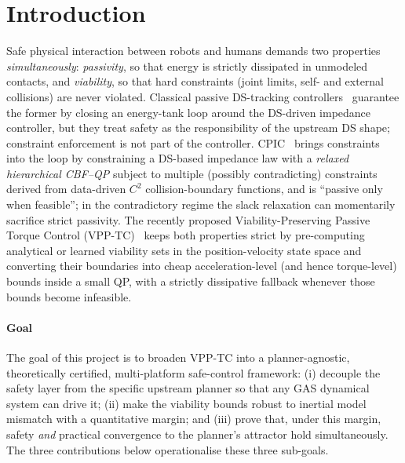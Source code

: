 \documentclass[10pt,conference]{IEEEtran}
\theoremstyle{remark}
\theoremstyle{plain}
\begin{document}
\section{Introduction}
\label{sec:intro}

Safe physical interaction between robots and humans demands two
properties \emph{simultaneously}: \emph{passivity}, so that energy
is strictly dissipated in unmodeled contacts, and \emph{viability},
so that hard constraints (joint limits, self- and external
collisions) are never violated.  Classical passive DS-tracking
controllers~\cite{kronander2016passive} guarantee the former by
closing an energy-tank loop around the DS-driven impedance
controller, but they treat safety as the responsibility of the
upstream DS shape; constraint enforcement is not part of the
controller. CPIC~\cite{zhang2024cpic} brings constraints into the
loop by constraining a DS-based impedance law with a
\emph{relaxed hierarchical CBF--QP} subject to multiple
(possibly contradicting) constraints derived from data-driven $C^2$
collision-boundary functions, and is ``passive only when feasible'';
in the contradictory regime the slack relaxation can momentarily
sacrifice strict passivity. The recently proposed
Viability-Preserving Passive Torque Control
(VPP-TC)~\cite{zhang2025vpptc} keeps both properties strict by
pre-computing analytical or learned viability sets in the
position-velocity state space and converting their boundaries into
cheap acceleration-level (and hence torque-level) bounds inside a
small QP, with a strictly dissipative fallback whenever those
bounds become infeasible.

\paragraph*{Goal} The goal of this project is to broaden VPP-TC
into a planner-agnostic, theoretically certified, multi-platform
safe-control framework: (i) decouple the safety layer from the
specific upstream planner so that any GAS dynamical system can
drive it; (ii) make the viability bounds robust to inertial model
mismatch with a quantitative margin; and (iii) prove that, under
this margin, safety \emph{and} practical convergence to the
planner's attractor hold simultaneously. The three contributions
below operationalise these three sub-goals.
\end{document}
